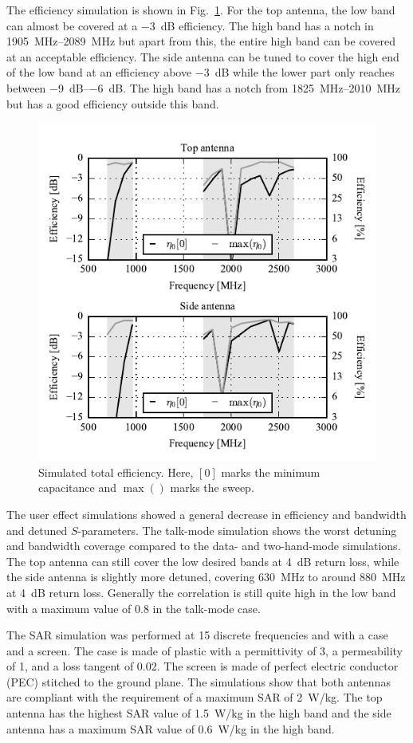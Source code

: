 The efficiency simulation is shown in Fig.~\ref{fig:sim_eff}. For the top antenna, the low band can almost be covered at a \SI{-3}{dB} efficiency. The high band has a notch in \SIrange{1905}{2089}{MHz} but apart from this, the entire high band can be covered at an acceptable efficiency. The side antenna can be tuned to cover the high end of the low band at an efficiency above
\SI{-3}{dB} while the lower part only reaches between \SIrange{-9}{-6}{dB}. The high band has a notch from \SIrange{1825}{2010}{MHz} but has a good efficiency outside this band.
\begin{figure}[tb]
    \centering
    \includegraphics{img/sim/eff/efficiency}
    \caption{Simulated total efficiency. Here, $[0]$ marks the minimum capacitance and $\max()$ marks the sweep. }
    \label{fig:sim_eff}
\end{figure}

The user effect simulations showed a general decrease in efficiency and bandwidth and detuned $S$-parameters. The talk-mode simulation shows the worst
detuning and bandwidth coverage compared to the data- and two-hand-mode simulations. The top antenna can still cover the low desired bands at \SI{4}{dB} return loss, while the side antenna is slightly more detuned, covering \SI{630}{MHz} to around \SI{880}{MHz} at \SI{4}{dB} return loss. Generally the correlation is still quite high in the low band with a maximum value of 0.8 in the talk-mode case.

The SAR simulation was performed at 15 discrete frequencies and with a case and a screen. The case is made of plastic with a permittivity of 3, a permeability of 1, and a loss tangent of \num{0.02}. The screen is made of perfect electric conductor (PEC) stitched to the ground plane. The simulations show that both antennas are compliant with the requirement of a maximum SAR of \SI{2}{W/kg}. The top antenna has the highest SAR value of \SI{1.5}{W/kg} in the high band and the side antenna has a maximum SAR value of \SI{0.6}{W/kg} in the high band. 

